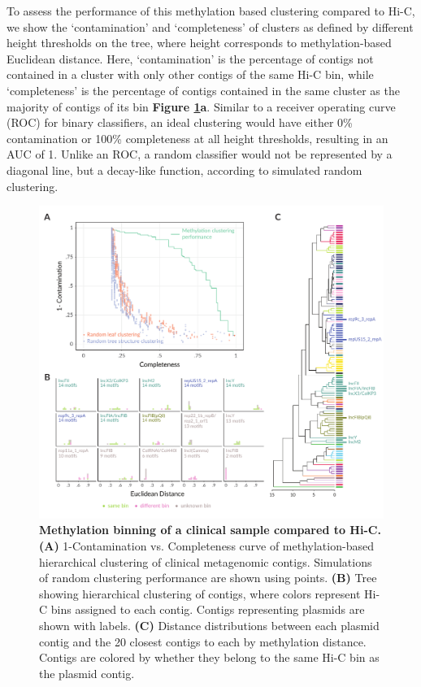 To assess the performance of this methylation based clustering compared to Hi-C, we show the ‘contamination’ and ‘completeness’ of clusters as defined by different height thresholds on the tree, where height corresponds to methylation-based Euclidean distance. Here, ‘contamination’ is the percentage of contigs not contained in a cluster with only other contigs of the same Hi-C bin, while ‘completeness’ is the percentage of contigs contained in the same cluster as the majority of contigs of its bin {\bf Figure \ref{fig:mdrfig}a}. Similar to a receiver operating curve (ROC) for binary classifiers, an ideal clustering would have either 0\% contamination or 100\% completeness at all height thresholds, resulting in an AUC of 1. Unlike an ROC, a random classifier would not be represented by a diagonal line, but a decay-like function, according to simulated random clustering.


\begin{figure}[!hb]
\centering
\includegraphics[width = 1\linewidth,keepaspectratio]{figure/mdrfig.pdf}
\caption[Methylation binning of a clinical sample compared to Hi-C]{{\bf Methylation binning of a clinical sample compared to Hi-C.} {\bf (A)} 1-Contamination vs. Completeness curve of methylation-based hierarchical clustering of clinical metagenomic contigs. Simulations of random clustering performance are shown using points. {\bf (B)} Tree showing hierarchical clustering of contigs, where colors represent Hi-C bins assigned to each contig. Contigs representing plasmids are shown with labels. {\bf (C)} Distance distributions between each plasmid contig and the 20 closest contigs to each by methylation distance. Contigs are colored by whether they belong to the same Hi-C bin as the plasmid contig. }
\label{fig:mdrfig}
\end{figure}



